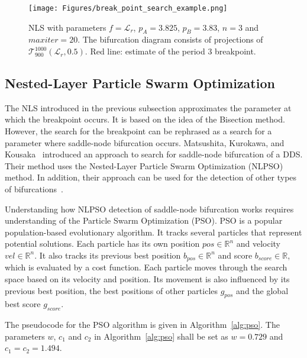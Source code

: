 \begin{figure}[!h]
    \centering
    \texttt{[image: Figures/break\_point\_search\_example.png]}
    \caption{
        NLS with parameters $f = \mathcal{L}_{r}$, $p_A = 3.825$, $p_B = 3.83$, $n = 3$ and $maxiter = 20$.
        The bifurcation diagram consists of projections of $\mathcal{T}_{900}^{1000}(\mathcal{L}_{r}, 0.5)$.
        Red line: estimate of the period $3$ breakpoint.
    }
    \label{fig:break_point_search_example}
\end{figure}


\subsection{Nested-Layer Particle Swarm Optimization}
The NLS introduced in the previous subsection approximates the parameter at which the breakpoint occurs.
It is based on the idea of the Bisection method.
However, the search for the breakpoint can be rephrased as a search for a parameter where saddle-node bifurcation occurs.
Matsushita, Kurokawa, and Kousaka~\cite{Matsushita2019} introduced an approach to search for saddle-node bifurcation of a DDS.
Their method uses the Nested-Layer Particle Swarm Optimization (NLPSO) method.
In addition, their approach can be used for the detection of other types of bifurcations~\cite{Matsushita20170721}.
\par
Understanding how NLPSO detection of saddle-node bifurcation works requires understanding of the Particle Swarm Optimization (PSO).
PSO is a popular population-based evolutionary algorithm.
It tracks several particles that represent potential solutions.
Each particle has its own position $pos \in \mathbb{R}^{n}$ and velocity $vel \in \mathbb{R}^{n}$. It also tracks its previous best position $b_{pos} \in \mathbb{R}^{n}$ and score $b_{score} \in \mathbb{R}$, which is evaluated by a cost function.
Each particle moves through the search space based on its velocity and position.
Its movement is also influenced by its previous best position, the best positions of other particles $g_{pos}$ and the global best score $g_{score}$.~\cite{Matsushita2019}
\par
The pseudocode for the PSO algorithm is given in Algorithm~\ref{alg:pso}.
The parameters $w$, $c_{1}$ and $c_{2}$ in Algorithm~\ref{alg:pso} shall be set as $w=0.729$ and $c_{1}=c_{2}=1.494$.~\cite{Matsushita2019}


